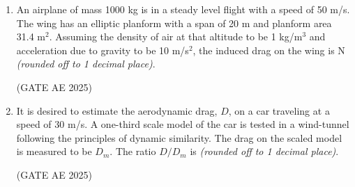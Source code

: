 \documentclass[journal,12pt,onecolumn]{IEEEtran}
\theoremstyle{remark}
\begin{document}
\begin{flushleft}
\begin{enumerate}
\item An airplane of mass 1000 kg is in a steady level flight with a speed of 50 m/s. The wing has an elliptic planform with a span of 20 m and planform area 31.4 m$^2$. Assuming the density of air at that altitude to be 1 kg/m$^3$ and acceleration due to gravity to be 10 m/s$^2$, the induced drag on the wing is \underline{\hspace{3cm}} N \textit{(rounded off to 1 decimal place)}.

\hfill (GATE AE 2025)

\item It is desired to estimate the aerodynamic drag, $D$, on a car traveling at a speed of 30 m/s. A one-third scale model of the car is tested in a wind-tunnel following the principles of dynamic similarity. The drag on the scaled model is measured to be $D_m$. The ratio $D/D_m$ is \underline{\hspace{3cm}} \textit{(rounded off to 1 decimal place)}.

\hfill (GATE AE 2025)

\end{enumerate}
\end{flushleft}
\end{document}
